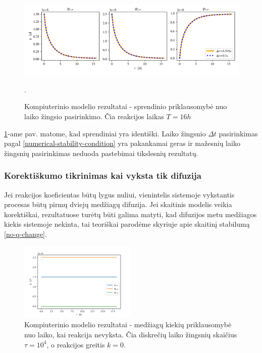 \begin{figure}[h!]

\centering

\includegraphics[width=\textwidth]{../assets/time-error-3.png}

\caption{Kompiuterinio modelio rezultatai - sprendinio priklausomybė nuo laiko žingsio pasirinkimo. Čia reakcijos laikas $T=16h$}.

\label{time-error}

\end{figure}

\ref{time-error}-ame pav. matome, kad sprendiniai yra identiški. Laiko žingsnio  $\Delta t$ pasirinkimas pagal \eqref{numerical-stability-condition} yra pakankamai geras ir mažesnių laiko žingsnių pasirinkimas neduoda pastebimai tikslesnių rezultatų.

\newpage
\subsubsection*{Korektiškumo tikrinimas kai vyksta tik difuzija}

Jei reakcijos koeficientas būtų lygus nuliui, vienintelis sistemoje vykstantis procesas būtų pirmų dviejų medžiagų difuzija. Jei skaitinis modelis veikia korektiškai, rezultatuose turėtų būti galima matyti, kad difuzijos metu medžiagos kiekis sistemoje nekinta, tai teoriškai parodėme skyriuje apie skaitinį stabilumą \eqref{no-q-change}.

\begin{figure}[h!]
    \centering
    \includegraphics[width=0.5\textwidth]{../assets/only-diff-1.png}
    \caption{Kompiuterinio modelio rezultatai - medžiagų kiekių priklausomybė nuo laiko, kai reakcija nevyksta. Čia diskrečių laiko žingsnių skaičius $\tau=10^4$, o reakcijos greitis $k = 0$. }
    \label{no-reaction}
\end{figure}

